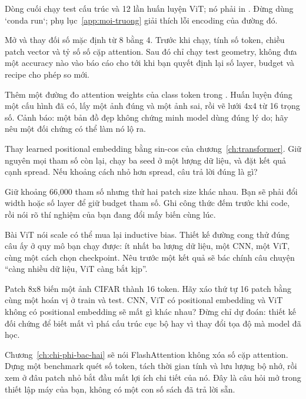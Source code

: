 Dòng cuối chạy test cấu trúc và 12 lần huấn luyện ViT; nó phải in
. Đừng dùng `conda run`; phụ lục~\ref{app:moi-truong} giải
thích lỗi encoding của đường đó.

\begin{bt}
  \item Mở  và thay đối số mặc định 
    từ 8 bằng 4. Trước khi
    chạy, tính số token, chiều patch vector và tỷ số số cặp attention. Sau đó
    chỉ chạy test geometry, không đưa một accuracy nào vào báo cáo cho tới khi
    bạn quyết định lại số layer, budget và recipe cho phép so mới.

  \item Thêm một đường đo attention weights của class token trong
    . Huấn luyện đúng một cấu hình đã có, lấy một ảnh đúng và
    một ảnh sai, rồi vẽ lưới 4x4 từ 16 trọng số. Cảnh báo: một bản đồ đẹp không
    chứng minh model dùng đúng lý do; hãy nêu một đối chứng có thể làm nó lộ ra.

  \item Thay learned positional embedding bằng sin-cos của
    chương~\ref{ch:transformer}. Giữ nguyên mọi tham số còn lại, chạy ba seed
    ở một lượng dữ liệu, và đặt kết quả cạnh spread. Nếu khoảng cách nhỏ hơn
    spread, câu trả lời đúng là gì?

  \item Giữ khoảng 66,000 tham số nhưng thử hai patch size khác nhau. Bạn sẽ
    phải đổi width hoặc số layer để giữ budget tham số. Ghi công thức đếm trước
    khi code, rồi nói rõ thí nghiệm của bạn đang đổi mấy biến cùng lúc.
\end{bt}

\tierextend

\begin{bt}
  \item Bài ViT nói scale có thể mua lại inductive bias. Thiết kế đường cong
    thử đúng câu ấy ở quy mô bạn chạy được: ít nhất ba lượng dữ liệu, một CNN,
    một ViT, cùng một cách chọn checkpoint. Nêu trước một kết quả sẽ bác chính
    câu chuyện \enquote{càng nhiều dữ liệu, ViT càng bắt kịp}.

  \item Patch 8x8 biến một ảnh CIFAR thành 16 token. Hãy xáo thứ tự 16 patch
    bằng cùng một hoán vị ở train và test. CNN, ViT có positional embedding và
    ViT không có positional embedding sẽ mất gì khác nhau? Đừng chỉ dự đoán:
    thiết kế đối chứng để biết mất vì phá cấu trúc cục bộ hay vì thay đổi tọa
    độ mà model đã học.

  \item Chương~\ref{ch:chi-phi-bac-hai} sẽ nói FlashAttention không xóa số
    cặp attention. Dựng một benchmark quét số token, tách thời gian tính và
    lưu lượng bộ nhớ, rồi xem ở đâu patch nhỏ bắt đầu mất lợi ích chi tiết của
    nó. Đây là câu hỏi mở trong thiết lập máy của bạn, không có một con số sách
    đã trả lời sẵn.
\end{bt}
